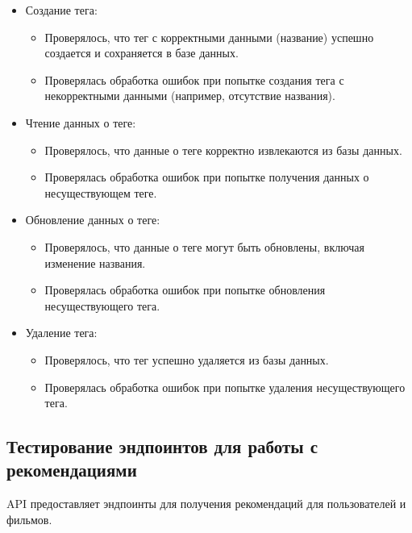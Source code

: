 \begin{itemize}
    \item Создание тега:
    \begin{itemize}
        \item Проверялось, что тег с корректными данными (название) успешно создается и сохраняется в базе данных.
        \item Проверялась обработка ошибок при попытке создания тега с некорректными данными (например, отсутствие названия).
    \end{itemize}
    \item Чтение данных о теге:
    \begin{itemize}
        \item Проверялось, что данные о теге корректно извлекаются из базы данных.
        \item Проверялась обработка ошибок при попытке получения данных о несуществующем теге.
    \end{itemize}
    \item Обновление данных о теге:
    \begin{itemize}
        \item Проверялось, что данные о теге могут быть обновлены, включая изменение названия.
        \item Проверялась обработка ошибок при попытке обновления несуществующего тега.
    \end{itemize}
    \item Удаление тега:
    \begin{itemize}
        \item Проверялось, что тег успешно удаляется из базы данных.
        \item Проверялась обработка ошибок при попытке удаления несуществующего тега.
    \end{itemize}
\end{itemize}

\subsection*{Тестирование эндпоинтов для работы с рекомендациями}
API предоставляет эндпоинты для получения рекомендаций для пользователей и фильмов.

